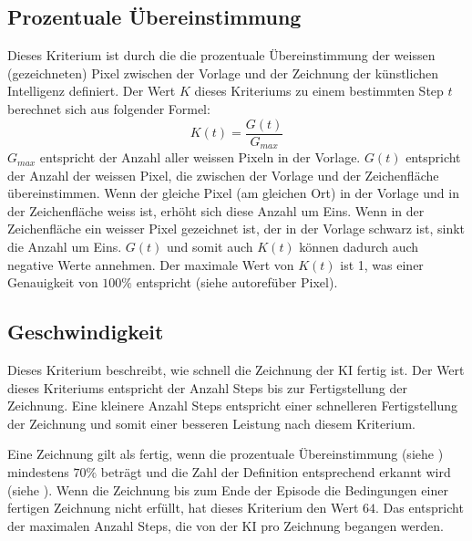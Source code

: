 \subsection{Prozentuale Übereinstimmung}
\label{sub:m_eval_proc}
Dieses Kriterium ist durch die die prozentuale Übereinstimmung der weissen
(gezeichneten) Pixel zwischen der Vorlage und der Zeichnung der künstlichen
Intelligenz definiert. Der Wert $K$ dieses Kriteriums zu einem bestimmten Step
$t$ berechnet sich aus folgender Formel:
\begin{equation}
  \label{eq:m_reward}
  K(t) = \frac{G(t)}{G_{max}}
\end{equation}
$G_{max}$ entspricht der Anzahl aller weissen Pixeln in der Vorlage. $G(t)$
entspricht der Anzahl der weissen Pixel, die zwischen der Vorlage und der
Zeichenfläche übereinstimmen. Wenn der gleiche Pixel (am gleichen Ort) in der
Vorlage und in der Zeichenfläche weiss ist, erhöht sich diese Anzahl um Eins.
Wenn in der Zeichenfläche ein weisser Pixel gezeichnet ist, der in der Vorlage
schwarz ist, sinkt die Anzahl um Eins. $G(t)$ und somit auch $K(t)$ können
dadurch auch negative Werte annehmen. Der maximale Wert von $K(t)$ ist 1, was
einer Genauigkeit von $100\%$ entspricht (siehe autoref{über Pixel}).


\subsection{Geschwindigkeit}
\label{sub:m_eval_speed}
Dieses Kriterium beschreibt, wie schnell die Zeichnung der KI fertig ist. Der
Wert dieses Kriteriums entspricht der Anzahl Steps bis zur Fertigstellung der
Zeichnung. Eine kleinere Anzahl Steps entspricht einer schnelleren Fertigstellung
der Zeichnung und somit einer besseren Leistung nach diesem Kriterium.

Eine Zeichnung gilt als fertig, wenn die prozentuale Übereinstimmung (siehe
) mindestens $70\%$ beträgt und die Zahl der Definition
entsprechend erkannt wird (siehe ). Wenn die Zeichnung
bis zum Ende der Episode die Bedingungen einer fertigen Zeichnung nicht erfüllt,
hat dieses Kriterium den Wert $64$. Das entspricht der maximalen Anzahl Steps,
die von der KI pro Zeichnung begangen werden.


